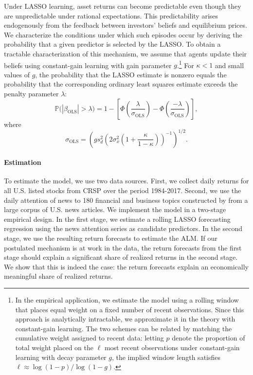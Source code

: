 \documentclass[11pt]{article}
\begin{document}
Under LASSO learning, asset returns can become predictable even though they are unpredictable under rational expectations.
This predictability arises endogenously from the feedback between investors’ beliefs and equilibrium prices.
We characterize the conditions under which such episodes occur by deriving the probability that a given predictor is selected by the LASSO.
To obtain a tractable characterization of this mechanism, we assume that agents update their beliefs using constant-gain learning with gain parameter $g$.\footnote{In the empirical application, we estimate the model using a rolling window that places equal weight on a fixed number of recent observations. Since this approach is analytically intractable, we approximate it in the theory with constant-gain learning. The two schemes can be related by matching the cumulative weight assigned to recent data: letting $p$ denote the proportion of total weight placed on the $\ell$ most recent observations under constant-gain learning with decay parameter $g$, the implied window length satisfies $\ell \approx \log(1-p)/\log(1-g)$.}
For $\kappa < 1$ and small values of $g$, the probability that the LASSO estimate is nonzero equals the probability that the corresponding ordinary least squares estimate exceeds the penalty parameter $\lambda$:
\begin{equation}
\mathbb{P}\big(|\beta_{\text{OLS}}| > \lambda\big)
= 1 - \left[
\Phi\left(\frac{\lambda}{\sigma_{\text{OLS}}}\right)
- \Phi\left(\frac{-\lambda}{\sigma_{\text{OLS}}}\right)
\right],
\end{equation}
where
\begin{equation}
\sigma_{\text{OLS}}
= \left(
g s_d^2
\left(
2 \sigma_x^2
\left(1 + \frac{\kappa}{1 - \kappa}\right)
\right)^{-1}
\right)^{1/2}.
\end{equation}


\paragraph{Estimation}

To estimate the model, we use two data sources.
First, we collect daily returns for all U.S. listed stocks from CRSP over the period 1984-2017.
Second, we use the daily attention of news to 180 financial and business topics constructed by \cite{bybee2024business} from a large corpus of U.S. news articles.
We implement the model in a two-stage empirical design.
In the first stage, we estimate a rolling LASSO forecasting regression using the news attention series as candidate predictors.
In the second stage, we use the resulting return forecasts to estimate the ALM.
If our postulated mechanism is at work in the data, the return forecasts from the first stage should explain a significant share of realized returns in the second stage.
We show that this is indeed the case: the return forecasts explain an economically meaningful share of realized returns.
\end{document}
